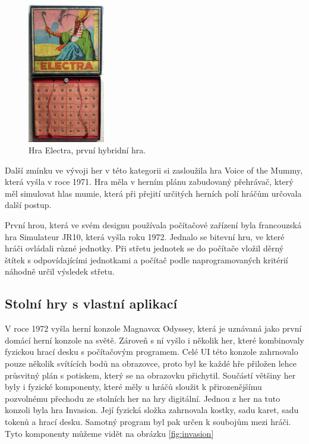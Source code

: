 \begin{figure}[H]
    \centering
    \includegraphics[width=0.3\textwidth]{resources/figures/electra.jpg}
    \caption{Hra Electra, první hybridní hra.\cite{history_of_hybrid_games}}
    \label{fig:electra}
\end{figure}

Další zmínku ve vývoji her v této kategorii si zasloužila hra Voice of the Mummy, která vyšla v roce 1971. Hra měla v herním plánu zabudovaný přehrávač, který měl simulovat hlas mumie, která při přejití určitých herních polí hráčům určovala další postup.\cite{voice_of_the_mummy}

První hrou, která ve svém designu používala počítačové zařízení byla francouzská hra Simulateur JR10, která vyšla roku 1972. Jednalo se bitevní hru, ve které hráči ovládali různé jednotky. Při střetu jednotek se do počítače vložil děrný štítek s odpovídajícími jednotkami a počítač podle naprogramovaných kritérií náhodně určil výsledek střetu.\cite{simulateur_jr10}

\subsection{Stolní hry s vlastní aplikací}
V roce 1972 vyšla herní konzole Magnavox Odyssey, která je uznávaná jako první domácí herní konzole na světě. Zároveň s ní vyšlo i několik her, které kombinovaly fyzickou hrací desku s počítačovým programem. Celé UI této konzole zahrnovalo pouze několik svítících bodů na obrazovce, proto byl ke každé hře přiložen lehce průsvitný plán s potiskem, který se na obrazovku přichytil. Součástí většiny her byly i fyzické komponenty, které měly u hráčů sloužit k přirozenějšímu pozvolnému přechodu ze stolních her na hry digitální.\cite{magnavox_odyssey} Jednou z her na tuto konzoli byla hra Invasion. Její fyzická složka zahrnovala kostky, sadu karet, sadu tokenů a hrací desku. Samotný program byl pak určen k soubojům mezi hráči. Tyto komponenty můžeme vidět na obrázku \ref{fig:invasion}\cite{invasion,invasion_gameplay}

